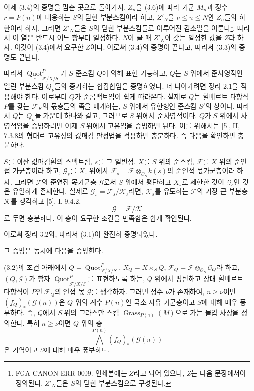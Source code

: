 이제 (3.4)의 증명을 멈춘 곳으로 돌아가자. $Z_n$을 (3.6)에 따라 가군
$M_n$과 정수 $r=P(n)$에 대응하는 $S$의 닫힌 부분스킴이라 하고,
$Z'_N$을 $\nu\leq n\leq N$인 $Z_n$들의 하한이라 하자. 그러면
$Z'_N$들은 $S$의 닫힌 부분스킴들로 이루어진 감소열을 이룬다\footnote{FGA-CANON-ERR-0009.
인쇄본에는 $Z$라고 되어 있으나, $Z$는 다음 문장에서야 정의된다.
$Z'_N$들은 $S$의 닫힌 부분스킴으로 구성된다.}. 따라서 이 열은 반드시
어느 항부터 일정하다. $N$이 클 때 $Z'_N$이 갖는 일정한 값을 $Z$라 하자.
이것이 (3.4)에서 요구한 $Z$이다. 이로써 (3.4)의 증명이 끝나고, 따라서
(3.3)의 증명도 끝난다.

따라서 $\underline{\operatorname{Quot}}^P_{\mathcal F/X/S}$가
$S$-준스킴 $Q$에 의해 표현 가능하고, $Q$는 $S$ 위에서 준사영적인 열린
부분스킴 $Q_\nu$들의 증가하는 합집합임을 증명하였다. 더 나아가려면
정리 2.1을 적용해야 한다. 이로부터 $Q$가 준콤팩트임이 쉽게 따라온다.
실제로 $Q$는 힐베르트 다항식 $P$를 갖는 $\mathcal F_K$의 몫층들의 족을
매개하는, $S$ 위에서 유한형인 준스킴 $S'$의 상이다. 따라서 $Q$는
$Q_\nu$들 가운데 하나와 같고, 그러므로 $S$ 위에서 준사영적이다. $Q$가
$S$ 위에서 사영적임을 증명하려면 이제 $S$ 위에서 고유임을 증명하면
된다. 이를 위해서는 [5], II, 7.3.8의 형태로 고유성의 값매김 판정법을
적용하면 충분하다. 즉 다음을 확인하면 충분하다.

 $S$를 이산 값매김환의 스펙트럼, $s$를 그 일반점,
$X$를 $S$ 위의 준스킴, $\mathcal F$를 $X$ 위의 준연접 가군층이라 하고,
$\mathcal G_s$를 $X_s$ 위에서
$\mathcal F_s=\mathcal F\otimes_{\mathcal O_S}k(s)$의 준연접 몫가군층이라 하자.
그러면 $\mathcal F$의 준연접 몫가군층 $\mathcal G$로서 $S$ 위에서 평탄하고
$X_s$로 제한한 것이 $\mathcal G_s$인 것은 유일하게 존재한다.
실제로 $\mathcal G_s=\mathcal F_s/\mathcal K_s$라면, $\mathcal K_s$를
유도하는 $\mathcal F$의 가장 큰 부분층 $\mathcal K$를 생각하고 [5], I,
9.4.2,
\[
\mathcal G=\mathcal F/\mathcal K
\]
로 두면 충분하다. 이 층이 요구한 조건을 만족함은 쉽게 확인된다.

이로써 정리 3.2와, 따라서 (3.1)이 완전히 증명되었다.

그 증명은 동시에 다음을 증명한다.

 (3.2)의 조건 아래에서
$Q=\operatorname{Quot}^P_{\mathcal F/X/S}$,
$X_Q=X\times_SQ$,
$\mathcal F_Q=\mathcal F\otimes_{\mathcal O_S}\mathcal O_Q$라 하고,
$(Q,\mathcal G)$가 함자
$\underline{\operatorname{Quot}}^P_{\mathcal F/X/S}$를 표현하도록 하는,
$Q$ 위에서 평탄하고 상대 힐베르트 다항식이 $P$인 $\mathcal F_Q$의
연접 몫 $\mathcal G$를 생각하자. 그러면 정수 $\nu$가 존재하여,
$n\geq\nu$이면 $(f_Q)_*(\mathcal G(n))$은 $Q$ 위의 계수 $P(n)$인
국소 자유 가군층이고 $S$에 대해 매우 풍부하다. 즉, $Q$에서 $S$ 위의
그라스만 스킴 $\operatorname{Grass}_{P(n)}(M)$으로 가는 몰입 사상을
정의한다. 특히 $n\geq\nu$이면 $Q$ 위의 층
\[
\bigwedge^{P(n)}(f_Q)_*(\mathcal G(n))
\]
은 가역이고 $S$에 대해 매우 풍부하다.

